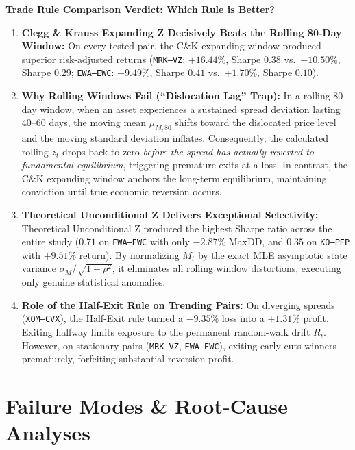 \documentclass[11pt, a4paper]{article}
\begin{document}
\noindent\textbf{Trade Rule Comparison Verdict: Which Rule is Better?}
\begin{enumerate}
    \item \textbf{Clegg \& Krauss Expanding Z Decisively Beats the Rolling 80-Day Window:} On every tested pair, the C\&K expanding window produced superior risk-adjusted returns (\texttt{MRK--VZ}: $+16.44\%$, Sharpe $0.38$ vs.\ $+10.50\%$, Sharpe $0.29$; \texttt{EWA--EWC}: $+9.49\%$, Sharpe $0.41$ vs.\ $+1.70\%$, Sharpe $0.10$).
    \item \textbf{Why Rolling Windows Fail (``Dislocation Lag'' Trap):} In a rolling 80-day window, when an asset experiences a sustained spread deviation lasting 40--60 days, the moving mean $\mu_{M, 80}$ shifts toward the dislocated price level and the moving standard deviation inflates. Consequently, the calculated rolling $z_t$ drops back to zero \textit{before the spread has actually reverted to fundamental equilibrium}, triggering premature exits at a loss. In contrast, the C\&K expanding window anchors the long-term equilibrium, maintaining conviction until true economic reversion occurs.
    \item \textbf{Theoretical Unconditional Z Delivers Exceptional Selectivity:} Theoretical Unconditional Z produced the highest Sharpe ratio across the entire study ($\mathbf{0.71}$ on \texttt{EWA--EWC} with only $\mathbf{-2.87\%}$ MaxDD, and $\mathbf{0.35}$ on \texttt{KO--PEP} with $+9.51\%$ return). By normalizing $M_t$ by the exact MLE asymptotic state variance $\sigma_M / \sqrt{1 - \rho^2}$, it eliminates all rolling window distortions, executing only genuine statistical anomalies.
    \item \textbf{Role of the Half-Exit Rule on Trending Pairs:} On diverging spreads (\texttt{XOM--CVX}), the Half-Exit rule turned a $-9.35\%$ loss into a $\mathbf{+1.31\%}$ profit. Exiting halfway limits exposure to the permanent random-walk drift $R_t$. However, on stationary pairs (\texttt{MRK--VZ}, \texttt{EWA--EWC}), exiting early cuts winners prematurely, forfeiting substantial reversion profit.
\end{enumerate}

\section{Failure Modes \& Root-Cause Analyses}
\end{document}
